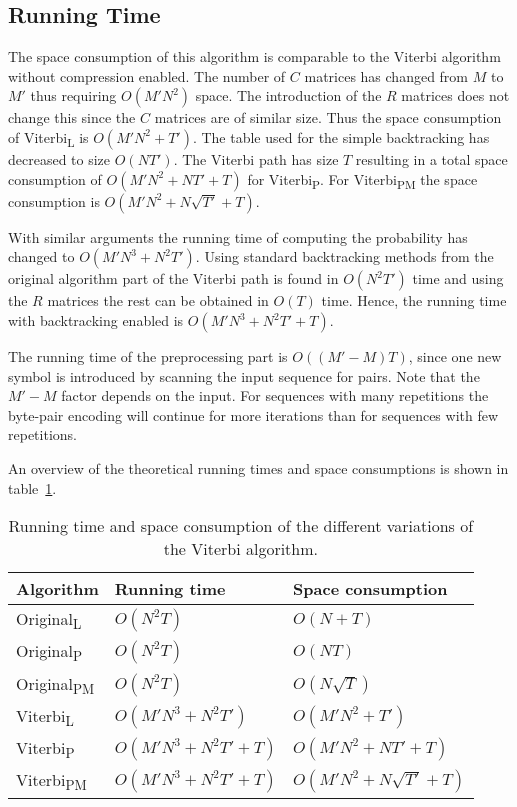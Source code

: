 \subsection{Running Time}
\label{sec:running-time}

The space consumption of this algorithm is comparable to the Viterbi algorithm
without compression enabled. The number of $C$ matrices has changed from $M$ to
$M'$ thus requiring $O(M' N^2)$ space. The introduction of the $R$ matrices
does not change this since the $C$ matrices are of similar size. Thus the space
consumption of Viterbi\textsubscript{L} is $O(M' N^2 + T')$. The table used for the
simple backtracking has decreased to size $O(N T')$. The Viterbi path has size
$T$ resulting in a total space consumption of $O(M' N^2 + N T' + T)$ for
Viterbi\textsubscript{P}. For Viterbi\textsubscript{PM} the space consumption
is $O(M' N^2 + N \sqrt{T'} + T)$.

With similar arguments the running time of computing the probability has changed
to $O(M' N^3 +N^2 T')$. Using standard backtracking methods from the original
algorithm part of the Viterbi path is found in $O(N^2 T')$ time and using the
$R$ matrices the rest can be obtained in $O(T)$ time. Hence, the
running time with backtracking enabled is $O(M' N^3 +N^2 T' + T)$.

The running time of the preprocessing part is $O(
(
  M' - M
) T)$, since one new symbol is introduced by scanning the input sequence for
pairs. Note that the $M' - M$
factor depends on the input. For sequences with many repetitions the byte-pair
encoding will continue for more iterations than for sequences with few
repetitions.

An overview of the theoretical running times and space consumptions is shown in
table~\ref{tab:running-time}.

\begin{table}
  \centering
  \caption{Running time and space consumption of the different variations of the
    Viterbi algorithm.}
  \label{tab:running-time}
  \begin{tabular}{lll}
    \toprule
    Algorithm                   & Running time             & Space consumption             \\
    \midrule
    Original\textsubscript{L}  & $O(N^2 T)$               & $O(N + T)$                    \\
    Original\textsubscript{P}  & $O(N^2 T)$               & $O(NT)$                       \\
    Original\textsubscript{PM} & $O(N^2 T)$               & $O(N\sqrt{T})$                \\
    Viterbi\textsubscript{L}    & $O(M' N^3 + N^2 T')$     & $O(M' N^2 + T')$              \\
    Viterbi\textsubscript{P}    & $O(M' N^3 + N^2 T' + T)$ & $O(M' N^2 + N T' + T)$        \\
    Viterbi\textsubscript{PM}   & $O(M' N^3 + N^2 T' + T)$ & $O(M' N^2 + N \sqrt{T'} + T)$ \\
    \bottomrule
  \end{tabular}
\end{table}

